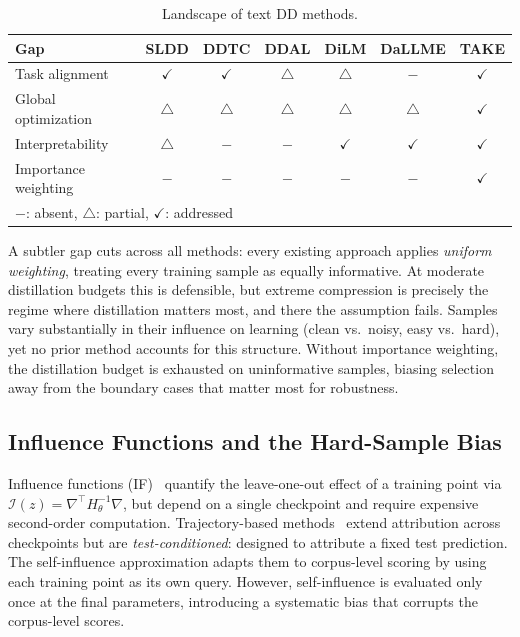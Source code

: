 \begin{table}[ht] %
  \centering
  \caption{Landscape of text DD methods.}
  \label{tab:landscape-textdd-methods}
  \setlength{\tabcolsep}{8pt}
  \begin{tabular}{l c c c c c c}
    \toprule
    \textbf{Gap}         & SLDD         & DDTC         & DDAL         & DiLM         & DaLLME       & \textbf{TAKE} \\
    \midrule
    Task alignment       & $\checkmark$ & $\checkmark$ & $\triangle$  & $\triangle$  & $-$          & $\checkmark$ \\
    Global optimization  & $\triangle$  & $\triangle$  & $\triangle$  & $\triangle$  & $\triangle$  & $\checkmark$ \\
    Interpretability     & $\triangle$  & $-$          & $-$          & $\checkmark$ & $\checkmark$ & $\checkmark$ \\
    Importance weighting & $-$          & $-$          & $-$          & $-$          & $-$          & $\checkmark$ \\
    \bottomrule
    \multicolumn{7}{l}{$-$: absent, $\triangle$: partial, $\checkmark$: addressed}
  \end{tabular}
\end{table}

\begin{foldable} %
  A subtler gap cuts across all methods: every existing approach applies \emph{uniform weighting}, treating every training sample as equally informative.
  At moderate distillation budgets this is defensible, but extreme compression is precisely the regime where distillation matters most, and there the assumption fails.
  Samples vary substantially in their influence on learning (clean vs.\ noisy, easy vs.\ hard), yet no prior method accounts for this structure.
  Without importance weighting, the distillation budget is exhausted on uninformative samples, biasing selection away from the boundary cases that matter most for robustness.
\end{foldable}

\subsection{Influence Functions and the Hard-Sample Bias} \label{sec:02-related-influence}
\begin{foldable} %
  Influence functions (IF)~\cite{cook1982residuals,koh2017understanding} quantify the leave-one-out effect of a training point via $\mathcal{I}(z) = \nabla^\top H_\theta^{-1} \nabla$, but depend on a single checkpoint and require expensive second-order computation.
  Trajectory-based methods~\cite{pruthi2020estimating,park2023trak,kwon2023datainf} extend attribution across checkpoints but are \emph{test-conditioned}: designed to attribute a fixed test prediction.
  The self-influence approximation adapts them to corpus-level scoring by using each training point as its own query.
  However, self-influence is evaluated only once at the final parameters, introducing a systematic bias that corrupts the corpus-level scores.
\end{foldable}

